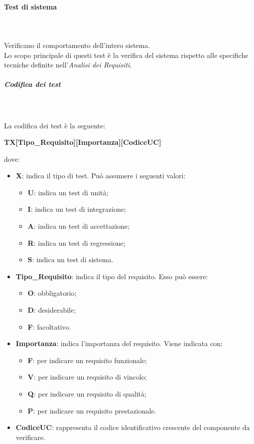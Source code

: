 \paragraph*{Test di sistema} \mbox{} \\ \mbox{} \\
Verificano il comportamento dell'intero sistema.\\
Lo scopo principale di questi test è la verifica del sistema rispetto alle specifiche tecniche definite nell'\textit{Analisi dei Requisiti}.
\pagebreak
\subparagraph*{Codifica dei test} \mbox{} \\ \mbox{} \\
La codifica dei test è la seguente: \\
\centerline{\textbf{TX[Tipo\_Requisito][Importanza][CodiceUC]}}
dove: \begin{itemize}
\item \textbf{X}: indica il tipo di test. Può assumere i seguenti valori: \begin{itemize}
\item \textbf{U}: indica un test di unità;
\item \textbf{I}: indica un test di integrazione;
\item \textbf{A}: indica un test di accettazione;
\item \textbf{R}: indica un test di regressione;
\item \textbf{S}: indica un test di sistema.
\end{itemize} 
\item \textbf{Tipo\_Requisito}: indica il tipo del requisito. Esso può essere: \begin{itemize}
\item \textbf{O}: obbligatorio;
\item \textbf{D}: desiderabile;
\item \textbf{F}: facoltativo.
\end{itemize}
\item \textbf{Importanza}: indica l'importanza del requisito. Viene indicata con: \begin{itemize}
\item \textbf{F}: per indicare un requisito funzionale;
\item \textbf{V}: per indicare un requisito di vincolo;
\item \textbf{Q}: per indicare un requisito di qualità;
\item \textbf{P}: per indicare un requisito prestazionale.
\end{itemize}
\item \textbf{CodiceUC}: rappresenta il codice identificativo crescente del componente da verificare.
\end{itemize}


